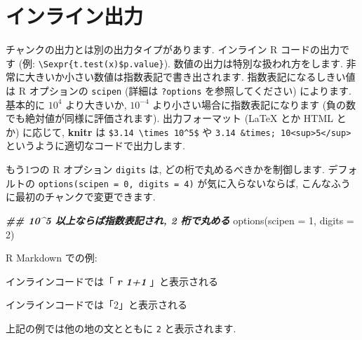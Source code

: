\documentclass[
]{bxjsreport}
\newenvironment{Shaded}{\begin{snugshade}}{\end{snugshade}}
\newcommand{\AttributeTok}[1]{\textcolor[rgb]{0.77,0.63,0.00}{#1}}
\newcommand{\DecValTok}[1]{\textcolor[rgb]{0.00,0.00,0.81}{#1}}
\newcommand{\DocumentationTok}[1]{\textcolor[rgb]{0.56,0.35,0.01}{\textbf{\textit{#1}}}}
\newcommand{\FunctionTok}[1]{\textcolor[rgb]{0.00,0.00,0.00}{#1}}
\newcommand{\InformationTok}[1]{\textcolor[rgb]{0.56,0.35,0.01}{\textbf{\textit{#1}}}}
\newcommand{\NormalTok}[1]{#1}
\begin{document}
\hypertarget{ux30a4ux30f3ux30e9ux30a4ux30f3ux51faux529b}{%
\section*{インライン出力}\label{ux30a4ux30f3ux30e9ux30a4ux30f3ux51faux529b}}

チャンクの出力とは別の出力タイプがあります. インライン R
コードの出力です (例:
\texttt{\textbackslash{}Sexpr\{t.test(x)\$p.value\}}).
数値の出力は特別な扱われ方をします.
非常に大きいか小さい数値は指数表記で書き出されます.
指数表記になるしきい値は R オプションの \texttt{scipen} (詳細は
\texttt{?options} を参照してください) によります. 基本的に \(10^4\)
より大きいか, \(10^{-4}\) より小さい場合に指数表記になります
(負の数でも絶対値が同様に評価されます). 出力フォーマット (LaTeX とか
HTML とか) に応じて, \textbf{knitr} は
\texttt{\$3.14\ \textbackslash{}times\ 10\^{}5\$} や
\texttt{3.14\ \&times;\ 10\textless{}sup\textgreater{}5\textless{}/sup\textgreater{}}
というように適切なコードで出力します.

もう1つの R オプション \texttt{digits} は,
どの桁で丸めるべきかを制御します. デフォルトの
\texttt{options(scipen\ =\ 0,\ digits\ =\ 4)} が気に入らないならば,
こんなふうに最初のチャンクで変更できます.

\begin{Shaded}
\begin{Highlighting}[numbers=left,,]
\DocumentationTok{\#\# 10\^{}5 以上ならば指数表記され, 2 桁で丸める}
\FunctionTok{options}\NormalTok{(}\AttributeTok{scipen =} \DecValTok{1}\NormalTok{, }\AttributeTok{digits =} \DecValTok{2}\NormalTok{)}
\end{Highlighting}
\end{Shaded}

R Markdown での例:

\begin{Shaded}
\begin{Highlighting}[]
\NormalTok{インラインコードでは「}\InformationTok{\textasciigrave{}\textasciigrave{}\textasciigrave{} \textasciigrave{}r\textquotesingle{}\textquotesingle{} 1+1\textasciigrave{} \textasciigrave{}\textasciigrave{}\textasciigrave{}}\NormalTok{」と表示される}
\end{Highlighting}
\end{Shaded}

インラインコードでは「2」と表示される

上記の例では他の地の文とともに \texttt{2} と表示されます.
\end{document}
